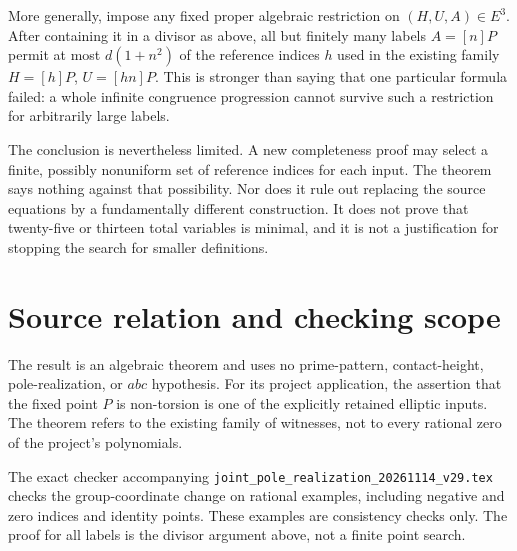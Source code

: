 \documentclass[10pt,a4paper]{article}
\begin{document}
More generally, impose any fixed proper algebraic restriction on
$(H,U,A)\in E^3$. After containing it in a divisor as above, all but
finitely many labels $A=[n]P$ permit at most $d(1+n^2)$ of the reference
indices $h$ used in the existing family $H=[h]P$, $U=[hn]P$.
This is stronger than saying that one particular formula failed: a
whole infinite congruence progression cannot survive such a restriction
for arbitrarily large labels.

The conclusion is nevertheless limited. A new completeness proof may
select a finite, possibly nonuniform set of reference indices for each
input. The theorem says nothing against that possibility. Nor does it
rule out replacing the source equations by a fundamentally different
construction. It does not prove that twenty-five or thirteen total
variables is minimal, and it is not a justification for stopping the
search for smaller definitions.

\section{Source relation and checking scope}
The result is an algebraic theorem and uses no prime-pattern,
contact-height, pole-realization, or $abc$ hypothesis. For its project
application, the assertion that the fixed point $P$ is non-torsion is
one of the explicitly retained elliptic inputs. The theorem refers to
the existing family of witnesses, not to every rational zero of the
project's polynomials.

The exact checker accompanying
\nolinkurl{joint_pole_realization_20261114_v29.tex}
checks the group-coordinate change on rational examples, including
negative and zero indices and identity points. These examples are
consistency checks only. The proof for all labels is the divisor
argument above, not a finite point search.
\end{document}
